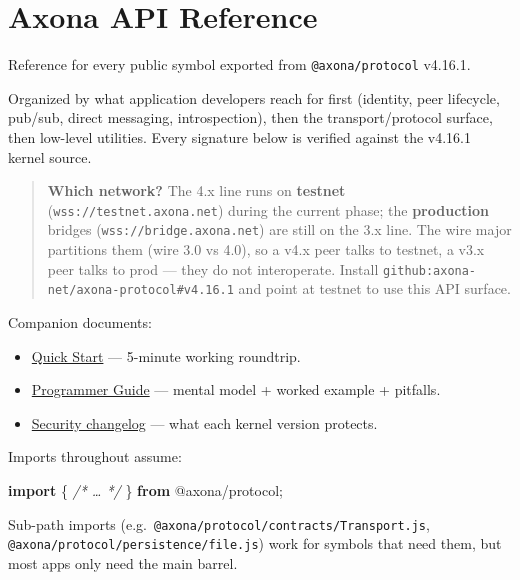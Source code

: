 \documentclass[
  nobib]{tufte-handout}
\author{}
\date{}
\newenvironment{Shaded}{}{}
\newcommand{\CommentTok}[1]{\textcolor[rgb]{0.38,0.63,0.69}{\textit{#1}}}
\newcommand{\ImportTok}[1]{\textcolor[rgb]{0.00,0.50,0.00}{\textbf{#1}}}
\newcommand{\NormalTok}[1]{#1}
\newcommand{\OperatorTok}[1]{\textcolor[rgb]{0.40,0.40,0.40}{#1}}
\newcommand{\StringTok}[1]{\textcolor[rgb]{0.25,0.44,0.63}{#1}}
\providecommand{\tightlist}{%
  \setlength{\itemsep}{0pt}\setlength{\parskip}{0pt}}
\begin{document}
\section{Axona API Reference}\label{axona-api-reference}

Reference for every public symbol exported from \texttt{@axona/protocol}
v4.16.1.

Organized by what application developers reach for first (identity, peer
lifecycle, pub/sub, direct messaging, introspection), then the
transport/protocol surface, then low-level utilities. Every signature
below is verified against the v4.16.1 kernel source.

\begin{quote}
\textbf{Which network?} The 4.x line runs on \textbf{testnet}
(\texttt{wss://testnet.axona.net}) during the current phase; the
\textbf{production} bridges (\texttt{wss://bridge.axona.net}) are still
on the 3.x line. The wire major partitions them (wire 3.0 vs 4.0), so a
v4.x peer talks to testnet, a v3.x peer talks to prod --- they do not
interoperate. Install \texttt{github:axona-net/axona-protocol\#v4.16.1}
and point at testnet to use this API surface.
\end{quote}

Companion documents:

\begin{itemize}
\tightlist
\item
  \href{Quick-Start-v4.16.1.md}{Quick Start} --- 5-minute working
  roundtrip.
\item
  \href{Axona-Programmer-Guide-v4.16.1.md}{Programmer Guide} --- mental
  model + worked example + pitfalls.
\item
  \href{../SECURITY-CHANGELOG.md}{Security changelog} --- what each
  kernel version protects.
\end{itemize}

Imports throughout assume:

\begin{Shaded}
\begin{Highlighting}[]
\ImportTok{import}\NormalTok{ \{ }\CommentTok{/* … */}\NormalTok{ \} }\ImportTok{from} \StringTok{\textquotesingle{}@axona/protocol\textquotesingle{}}\OperatorTok{;}
\end{Highlighting}
\end{Shaded}

Sub-path imports (e.g.~\texttt{@axona/protocol/contracts/Transport.js},
\texttt{@axona/protocol/persistence/file.js}) work for symbols that need
them, but most apps only need the main barrel.
\end{document}
